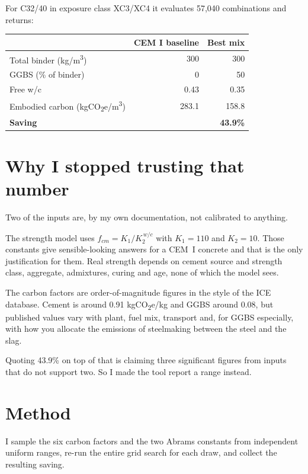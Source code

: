 \documentclass[11pt,a4paper]{article}
\begin{document}
For C32/40 in exposure class XC3/XC4 it evaluates 57{,}040 combinations and returns:

\begin{center}
\begin{tabular}{lrr}
\toprule
 & \textbf{CEM I baseline} & \textbf{Best mix} \\
\midrule
Total binder (kg/m\textsuperscript{3}) & 300 & 300 \\
GGBS (\% of binder)                    & 0   & 50 \\
Free w/c                               & 0.43 & 0.35 \\
Embodied carbon (kgCO\textsubscript{2}e/m\textsuperscript{3}) & 283.1 & 158.8 \\
\midrule
\multicolumn{2}{l}{\textbf{Saving}} & \textbf{43.9\%} \\
\bottomrule
\end{tabular}
\end{center}

\section{Why I stopped trusting that number}

Two of the inputs are, by my own documentation, not calibrated to anything.

The strength model uses $f_{cm} = K_1 / K_2^{\,w/c}$ with $K_1 = 110$ and $K_2 = 10$. Those
constants give sensible-looking answers for a CEM~I concrete and that is the only justification
for them. Real strength depends on cement source and strength class, aggregate, admixtures,
curing and age, none of which the model sees.

The carbon factors are order-of-magnitude figures in the style of the ICE database. Cement is
around 0.91 kgCO\textsubscript{2}e/kg and GGBS around 0.08, but published values vary with plant,
fuel mix, transport and, for GGBS especially, with how you allocate the emissions of steelmaking
between the steel and the slag.

Quoting 43.9\% on top of that is claiming three significant figures from inputs that do not
support two. So I made the tool report a range instead.

\section{Method}

I sample the six carbon factors and the two Abrams constants from independent uniform ranges,
re-run the entire grid search for each draw, and collect the resulting saving.
\end{document}
